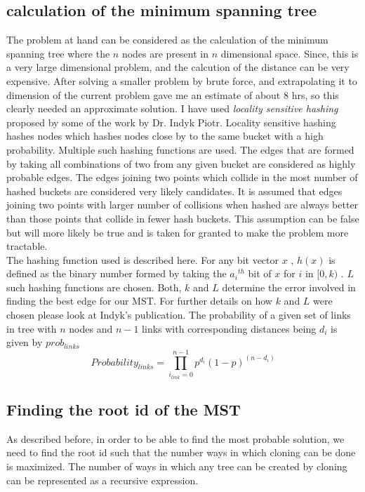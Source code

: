 \documentclass[12pt]{article}
\begin{document}
\subsection{calculation of the minimum spanning tree}
The problem at hand can be considered as the calculation of the minimum spanning tree where the $n$ nodes are present in $n$ dimensional space. Since, this is a very large dimensional problem, and the calcution of the distance can be very expensive. After solving a smaller problem by brute force, and extrapolating it to dimension of the current problem gave me an estimate of about 8 hrs, so this clearly needed an approximate solution. I have used \emph{locality sensitive hashing} proposed by some of the work by Dr. Indyk Piotr. Locality sensitive hashing hashes nodes which hashes nodes close by to the same bucket with a high probability. Multiple such hashing functions are used. The edges that are formed by taking all combinations of two from any given bucket are considered as highly probable edges. The edges joining two points which collide in the most number of hashed buckets are considered very likely candidates. It is assumed that edges joining two points with larger number of collisions when hashed are always better than those points that collide in fewer hash buckets. This assumption can be false but will more likely be true and is taken for granted to make the problem more tractable. \\

The hashing function used is described here. For any bit vector $x$ , $h(x)$ is defined as the binary number formed by taking the ${a_i}^{th}$ bit of $x$ for $i$ in $[0,k)$ . $L$ such hashing functions are chosen. Both, $k$ and $L$ determine the error involved in finding the best edge for our MST. For further details on how $k$ and $L$ were chosen please look at Indyk's publication. The probability of a given set of links in tree with $n$ nodes and $n-1$ links with corresponding distances being $d_i$ is given by $prob_{links}$ \\
\begin{equation}
  Probability_{links} = \prod_{i_{link} = 0}^{n-1} p^{d_i}(1-p)^{(n-d_i)}
\end{equation}

\subsection{Finding the root id of the MST}
As described before, in order to be able to find the most probable solution, we need to find the root id such that the number ways in which cloning can be done is maximized. The number of ways in which any tree can be created by cloning can be represented as a recursive expression. \\
\end{document}
